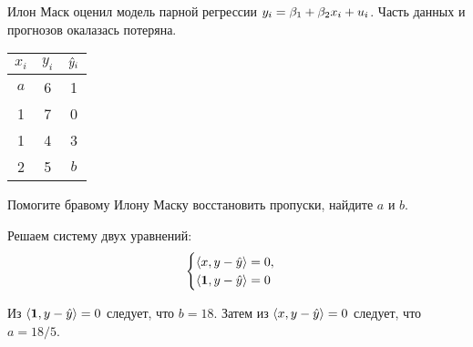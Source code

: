 \begin{problem}
Илон Маск оценил модель парной регрессии $y_i = \beta_1 + \beta_2 x_i + u_i$.
Часть данных и прогнозов окалазась потеряна. 

\begin{tabular}{ccc}
  \toprule
  $x_i$ & $y_i$ & $\hat{y}_i$ \\
  \midrule
  $a$ & 6 & 1 \\
  1 & 7 & 0 \\
  1 & 4 & 3 \\
  2 & 5 & $b$ \\
  \bottomrule
\end{tabular}
  
Помогите бравому Илону Маску восстановить пропуски, найдите $a$ и $b$. 
\begin{sol}
Решаем систему двух уравнений:
\[
\begin{cases}
  \langle x, y - \hat{y} \rangle = 0, \\
  \langle \boldsymbol{1}, y - \hat{y} \rangle = 0 
\end{cases}
\]

Из $\langle \boldsymbol{1}, y - \hat{y} \rangle = 0$ следует, что $b=18$. 
Затем из $\langle x, y - \hat{y} \rangle = 0$ следует, что $a=18/5$.
\end{sol}
\end{problem}





